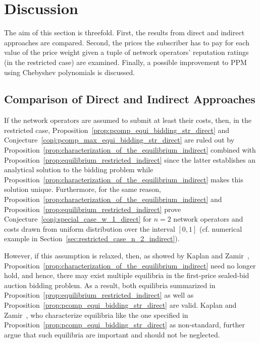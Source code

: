 

\section{Discussion} %
\label{sec:discussion_indirect}
The aim of this section is threefold. First, the results from direct and indirect approaches are compared. Second, the prices the subscriber has to pay for each value of the price weight given a tuple of network operators' reputation ratings (in the restricted case) are examined. Finally, a possible improvement to PPM using Chebyshev polynomials is discussed.

\subsection{Comparison of Direct and Indirect Approaches} %
\label{sub:comparison_of_direct_and_indirect_approaches_indirect}
If the network operators are assumed to submit at least their costs, then, in the restricted case, Proposition~\ref{prop:pcomp_equi_bidding_str_direct} and Conjecture~\ref{conj:pcomp_max_equi_bidding_str_direct} are ruled out by Proposition~\ref{prop:characterization_of_the_equilibrium_indirect} combined with Proposition~\ref{prop:equilibrium_restricted_indirect} since the latter establishes an analytical solution to the bidding problem while Proposition~\ref{prop:characterization_of_the_equilibrium_indirect} makes this solution unique. Furthermore, for the same reason, Proposition~\ref{prop:characterization_of_the_equilibrium_indirect} and Proposition~\ref{prop:equilibrium_restricted_indirect} prove Conjecture~\ref{conj:special_case_w_1_direct} for $n=2$ network operators and costs drawn from uniform distribution over the interval $[0,1]$ (cf. numerical example in Section~\ref{sec:restricted_case_n_2_indirect}).

However, if this assumption is relaxed, then, as showed by Kaplan and Zamir~\cite{KaplanZamir2011}, Proposition~\ref{prop:characterization_of_the_equilibrium_indirect} need no longer hold, and hence, there may exist multiple equilibria in the first-price sealed-bid auction bidding problem. As a result, both equilibria summarized in Proposition~\ref{prop:equilibrium_restricted_indirect} as well as Proposition~\ref{prop:pcomp_equi_bidding_str_direct} are valid. Kaplan and Zamir~\cite{KaplanZamir2011}, who characterize equilibria like the one specified in Proposition~\ref{prop:pcomp_equi_bidding_str_direct} as non-standard, further argue that such equilibria are important and should not be neglected.

